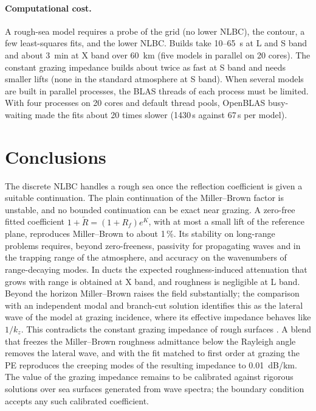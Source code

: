 \documentclass[11pt,a4paper]{article}
\newcommand{\kz}{k_z}
\newcommand{\Rt}{\tilde R}
\begin{document}
\paragraph{Computational cost.}
A rough-sea model requires a probe of the grid (no lower NLBC), the contour,
a few least-squares fits, and the lower NLBC. Builds take 10--\SI{65}{s} at L and S
band and about \SI{3}{min} at X band over \SI{60}{km} (five models in parallel on
20 cores). The constant grazing impedance builds about twice as fast at S band and
needs smaller lifts (none in the standard atmosphere at S band). When several models are
built in parallel processes, the BLAS threads of each process must be limited. With
four processes on 20 cores and default thread pools, OpenBLAS busy-waiting made the
fits about 20 times slower (1430\,s against 67\,s per model).

\section{Conclusions}
The discrete NLBC handles a rough sea once the reflection coefficient is given a
suitable continuation. The plain continuation of the Miller--Brown factor is
unstable, and no bounded continuation can be exact near grazing. A zero-free
fitted coefficient $1+\Rt=(1+R_f)e^K$, with at most a small lift of the reference
plane, reproduces Miller--Brown to about 1\,\%. Its stability on long-range problems
requires, beyond zero-freeness, passivity for propagating waves and in the trapping
range of the atmosphere, and accuracy on the wavenumbers of range-decaying modes.
In ducts the expected roughness-induced attenuation that grows with range is
obtained at X band, and roughness is negligible at L band. Beyond the horizon
Miller--Brown raises the field substantially; the comparison with an independent
modal and branch-cut solution identifies this as the lateral wave of the model at
grazing incidence, where its effective impedance behaves like $1/\kz$. This
contradicts the constant grazing impedance of rough surfaces \cite{barrick1998}. A
blend that freezes the Miller--Brown roughness admittance below the Rayleigh angle
removes the lateral wave, and with the fit matched to first order at grazing the PE
reproduces the creeping modes of the resulting impedance to \SI{0.01}{dB/km}. The
value of the grazing impedance remains to be calibrated against rigorous solutions
over sea surfaces generated from wave spectra; the boundary condition accepts any
such calibrated coefficient.
\end{document}
